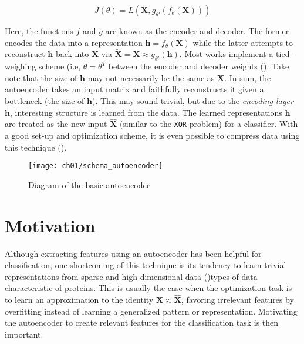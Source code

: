 \[
    J(\theta) = L(\mathbf{X}, g_{\theta'}(f_{\theta}(\mathbf{X})))
\]

\noindent Here, the functions $f$ and $g$ are known as the encoder and decoder.
The former encodes the data into a representation $\mathbf{h} = f_{\theta}
(\mathbf{X})$ while the latter attempts to reconstruct $\mathbf{h}$ back into 
$\mathbf{X}$ via $\mathbf{\widetilde{X}} = \mathbf{X} \approx g_{\theta'}
(\mathbf{h})$. Most works implement a tied-weighing scheme (i.e,
$\theta=\theta^{T}$ between the encoder and decoder weights
(\cite{bengio2013representation}). Take note that the
size of $\mathbf{h}$ may not necessarily be the same as $\mathbf{X}$. In sum,
the autoencoder takes an input matrix and faithfully reconstructs it given a
bottleneck (the size of $\mathbf{h}$). This may sound trivial, but due to the
\textit{encoding layer}  $\mathbf{h}$, interesting structure is learned from
the data. The learned representations $\mathbf{h}$ are treated as the new
input $\mathbf{\widehat{X}}$  (similar to the \texttt{XOR} problem) for a
classifier. With a good set-up and optimization scheme, it is even possible to
compress data using this technique (\cite{theis2017lossy}).

\begin{figure}[!t]
  \centering
  \texttt{[image: ch01/schema\_autoencoder]}
  \caption[Diagram of the basic autoencoder]{
      Diagram of the basic autoencoder
  }
  \label{schema:autoencoder}
\end{figure}

\section{Motivation}
\label{Motivation}

\par Although extracting features using an autoencoder has been helpful for
classification, one shortcoming of this technique is its tendency to learn
trivial representations from sparse and high-dimensional data
(\cite{wang2017feature, chen2017kate})\textemdash types of data characteristic
of proteins. This is usually the case when the optimization task is to learn
an approximation to the identity $\mathbf{X} \approx \mathbf{\widehat{X}}$,
favoring irrelevant features by overfitting instead of learning a generalized
pattern or representation. Motivating the autoencoder to create relevant features
for the classification task is then important.

